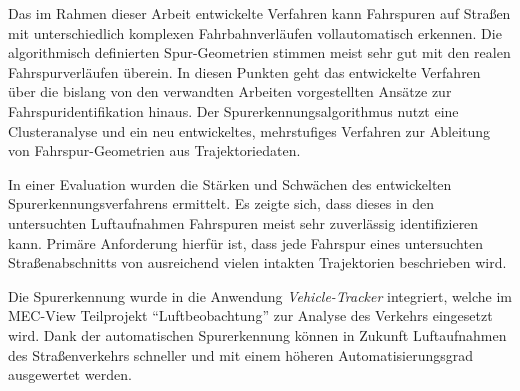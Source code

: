 Das im Rahmen dieser Arbeit entwickelte Verfahren kann Fahrspuren auf Straßen mit unterschiedlich komplexen
Fahrbahnverläufen vollautomatisch erkennen.
Die algorithmisch definierten Spur-Geometrien stimmen meist sehr gut mit den realen
Fahrspurverläufen überein. In diesen Punkten geht das entwickelte Verfahren über die bislang von den
verwandten Arbeiten vorgestellten Ansätze zur Fahrspuridentifikation hinaus.
Der Spurerkennungsalgorithmus nutzt eine Clusteranalyse und ein neu entwickeltes, mehrstufiges Verfahren zur
Ableitung von Fahrspur-Geometrien aus Trajektoriedaten.

In einer Evaluation wurden die Stärken und Schwächen des entwickelten Spurerkennungsverfahrens ermittelt.
Es zeigte sich, dass dieses in den untersuchten Luftaufnahmen Fahrspuren meist sehr zuverlässig identifizieren kann.
Primäre Anforderung hierfür ist, dass jede Fahrspur eines untersuchten Straßenabschnitts von ausreichend vielen intakten
Trajektorien beschrieben wird.

Die Spurerkennung wurde in die Anwendung \textit{Vehicle-Tracker} integriert,
welche im MEC-View Teilprojekt ``Luftbeobachtung'' zur Analyse des Verkehrs eingesetzt wird.
Dank der automatischen Spurerkennung können in Zukunft Luftaufnahmen des Straßenverkehrs schneller und
mit einem höheren Automatisierungsgrad ausgewertet werden.